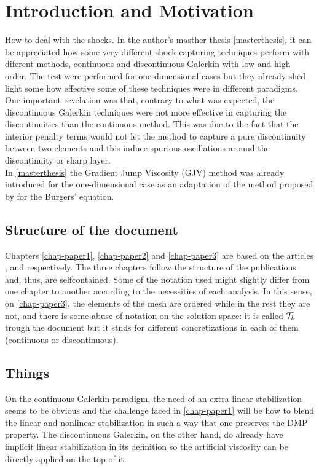 \chapter{Introduction and Motivation}
\label{chap-intro}


How to deal with the shocks. In the {author's} masther thesis \ref{masterthesis}, it can be appreciated how some very different shock capturing techniques perform with diferent methods, continuous and discontinuous Galerkin with low and high order. The test were performed for one-dimensional cases but they already shed light some how effective some of these techniques were in different paradigms.\\

One important revelation was that, contrary to what was expected, the discontinuous Galerkin techniques were not more effective in capturing the discontinuities than the continuous method. This was due to the fact that the interior penalty terms would not let the method to capture a pure discontinuity between two elements and this induce spurious oscillations around the discontinuity or sharp layer.\\

In \ref{masterthesis} the Gradient Jump Viscosity (GJV) method was already introduced for the one-dimensional case as an adaptation of the method proposed by \cite{burman_nonlinear_2007} for the Burgers' equation.

\section{Structure of the document}
Chapters \ref{chap-paper1}, \ref{chap-paper2} and \ref{chap-paper3} are based on the  articles \cite{badia_stabilized_2012}, \cite{badia_discrete_2015} and \cite{paper3} respectively. The three chapters follow the structure of the publications and, thus, are selfcontained. Some of the notation used might slightly differ from one chapter to another according to the necessities of each analysis. In this sense, on \ref{chap-paper3}, the elements of the mesh are ordered while in the rest they are not, and there is some abuse of notation on the solution space: it is called $\mathcal{T}_h$ trough the document but it stnds for different concretizations in each of them (continuous or discontinuous). 

\section{Things}
On the continuous Galerkin paradigm, the need of an extra linear stabilization seems to be obvious and the challenge faced in \ref{chap-paper1} will be how to blend the linear and nonlinear stabilization in such a way that one preserves the DMP property. The discontinuous Galerkin, on the other hand, do already have implicit linear stabilization in its definition so the artificial viscosity can be directly applied on the top of it.\\


